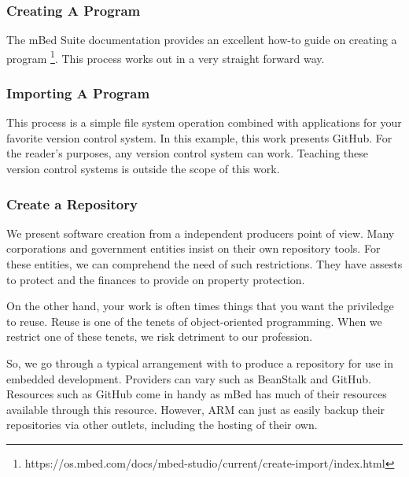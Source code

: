 \documentclass{article}
\begin{document}
\subsubsection{Creating A Program} %
\label{ssub:creating_a_program}
The mBed Suite documentation provides an excellent how-to guide on creating a program \footnote{https://os.mbed.com/docs/mbed-studio/current/create-import/index.html}.   This process works out in a very straight forward way.  




\subsubsection{Importing A Program} %
\label{ssub:importing_a_program}

This process is a simple file system operation combined with applications for your favorite version control system.  In this example, this work presents GitHub.  For the reader's purposes, any version control system can work.  Teaching these version control systems is outside the scope of this work.



\subsubsection{Create a Repository} %
\label{ssub:create_a_repository}

We present software creation from a independent producers point of view.  Many corporations and government entities insist on their own repository tools.  For these entities, we can comprehend the need of such restrictions.  They have assests to protect and the finances to provide on property protection.  

On the other hand, your work is often times things that you want the priviledge to reuse.  Reuse is one of the tenets of object-oriented programming.  When we restrict one of these tenets, we risk detriment to our profession.  

So, we go through a typical arrangement with to produce a repository for use in embedded development.  Providers can vary such as BeanStalk and GitHub.  Resources such as GitHub come in handy as mBed has much of their resources available through this resource.  However, ARM can just as easily backup their repositories via other outlets, including the hosting of their own. 
\end{document}
